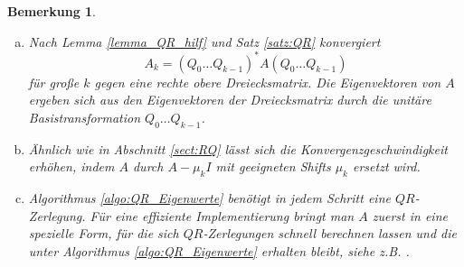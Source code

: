 \documentclass[
]{mycourse}
\theoremstyle{mythm}
\newtheorem{bemerkung}[theorem]{Bemerkung}
\theoremstyle{break}
\begin{document}
\begin{bemerkung}
\begin{enumerate}[(a)]
\item Nach Lemma \ref{lemma_QR_hilf} und Satz \ref{satz:QR} konvergiert
\[
A_{k}=(Q_0 \ldots Q_{k-1})^* A (Q_0 \ldots Q_{k-1})
\]
für große $k$ gegen eine rechte obere Dreiecksmatrix. Die Eigenvektoren von $A$ ergeben
sich aus den Eigenvektoren der Dreiecksmatrix durch die unitäre Basistransformation $Q_0 \ldots Q_{k-1}$.
\item Ähnlich wie in Abschnitt \ref{sect:RQ} lässt sich die Konvergenzgeschwindigkeit erhöhen,
indem $A$ durch $A-\mu_k I$ mit geeigneten \emph{Shifts} $\mu_k$ ersetzt wird.
%
\item Algorithmus \ref{algo:QR_Eigenwerte} benötigt in jedem Schritt eine $QR$-Zerlegung. Für eine 
effiziente Implementierung bringt man $A$ zuerst in eine spezielle Form, für die sich $QR$-Zerlegungen schnell berechnen lassen
und die unter Algorithmus \ref{algo:QR_Eigenwerte} erhalten bleibt, siehe z.B. \cite{Hanke}.
\end{enumerate}
\end{bemerkung}
\end{document}
